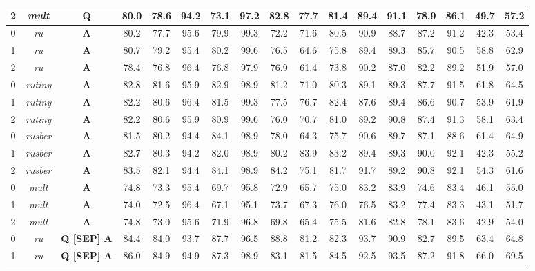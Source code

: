 \begin{table}[]
{\begin{tabular}{|c|c||c|c|c|c|c|c|c|c|c|c|c|c|c|c|c|}
2 & \textit{mult} &  \textbf{Q} & 80.0 & 78.6 & 94.2 & 73.1 & 97.2 & 82.8 & 77.7 & 81.4 & 89.4 & 91.1 & 78.9 & 86.1 & 49.7 & 57.2\\ \hline
0 & \textit{ru} &  \textbf{A} & 80.2 & 77.7 & 95.6 & 79.9 & 99.3 & 72.2 & 71.6 & 80.5 & 90.9 & 88.7 & 87.2 & 91.2 & 42.3 & 53.4\\ \hline
1 & \textit{ru} &  \textbf{A} & 80.7 & 79.2 & 95.4 & 80.2 & 99.6 & 76.5 & 64.6 & 75.8 & 89.4 & 89.3 & 85.7 & 90.5 & 58.8 & 62.9\\ \hline
2 & \textit{ru} &  \textbf{A} & 78.4 & 76.8 & 96.4 & 76.8 & 97.9 & 76.9 & 61.4 & 73.8 & 90.2 & 87.0 & 82.2 & 89.2 & 51.9 & 57.0\\ \hline
0 & \textit{rutiny} &  \textbf{A} & 82.8 & 81.6 & 95.9 & 82.9 & 98.9 & 81.2 & 71.0 & 80.3 & 89.1 & 89.3 & 87.7 & 91.5 & 61.8 & 64.5\\ \hline
1 & \textit{rutiny} &  \textbf{A} & 82.2 & 80.6 & 96.4 & 81.5 & 99.3 & 77.5 & 76.7 & 82.4 & 87.6 & 89.4 & 86.6 & 90.7 & 53.9 & 61.9\\ \hline
2 & \textit{rutiny} &  \textbf{A} & 82.2 & 80.6 & 95.9 & 80.9 & 99.6 & 76.0 & 70.7 & 81.0 & 89.2 & 90.8 & 87.4 & 91.3 & 58.1 & 63.4\\ \hline
0 & \textit{rusber} &  \textbf{A} & 81.5 & 80.2 & 94.4 & 84.1 & 98.9 & 78.0 & 64.3 & 75.7 & 90.6 & 89.7 & 87.1 & 88.6 & 61.4 & 64.9\\ \hline
1 & \textit{rusber} &  \textbf{A} & 82.7 & 80.3 & 94.2 & 82.0 & 98.9 & 80.2 & 83.9 & 83.2 & 89.4 & 89.3 & 90.0 & 92.1 & 42.3 & 55.2\\ \hline
2 & \textit{rusber} &  \textbf{A} & 83.5 & 82.1 & 94.4 & 84.1 & 98.9 & 84.2 & 75.1 & 81.7 & 91.7 & 89.2 & 90.8 & 92.1 & 54.3 & 61.6\\ \hline
0 & \textit{mult} &  \textbf{A} & 74.8 & 73.3 & 95.4 & 69.7 & 95.8 & 72.9 & 65.7 & 75.0 & 83.2 & 83.9 & 74.6 & 83.4 & 46.1 & 55.0\\ \hline
1 & \textit{mult} &  \textbf{A} & 74.0 & 72.5 & 96.4 & 67.1 & 95.1 & 73.7 & 67.3 & 76.0 & 76.5 & 83.2 & 77.4 & 83.3 & 43.1 & 51.7\\ \hline
2 & \textit{mult} &  \textbf{A} & 74.8 & 73.0 & 95.6 & 71.9 & 96.8 & 69.8 & 65.4 & 75.5 & 81.6 & 82.8 & 78.1 & 83.6 & 42.9 & 54.0\\ \hline
0 & \textit{ru} &  \textbf{Q [SEP] A} & 84.4 & 84.0 & 93.7 & 87.7 & 96.5 & 88.8 & 81.2 & 82.3 & 93.7 & 90.9 & 82.7 & 89.5 & 63.4 & 64.8\\ \hline
1 & \textit{ru} &  \textbf{Q [SEP] A} & 86.0 & 84.9 & 94.9 & 87.3 & 98.9 & 83.1 & 81.5 & 84.5 & 92.5 & 93.5 & 87.2 & 91.8 & 66.0 & 69.5\\ \hline

\end{tabular}}
\end{table}
